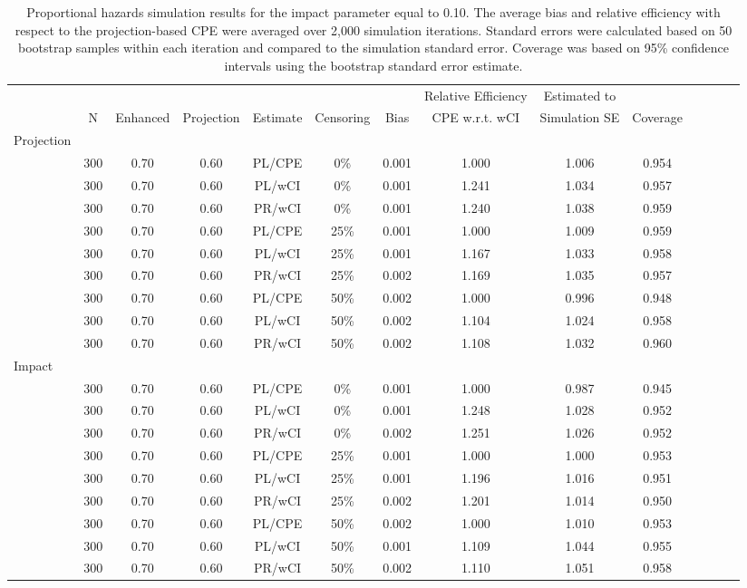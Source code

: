 \documentclass[12pt]{article}
\begin{document}
 
 
 \begin{table}[ht]
 \caption{Proportional hazards simulation results for the impact parameter equal to  0.10.
  The average bias and relative efficiency with respect to the projection-based CPE were averaged over 2,000 simulation iterations. Standard errors were calculated based on 50 bootstrap samples within each iteration and compared to the simulation standard error. Coverage was based on 95\% confidence intervals using the bootstrap standard error estimate.   }
\centering
\tiny
\begin{tabular}{lccccccccccccc} \label{PHsimresultsDelta010}
\vspace{-0.25cm}
   &&&&&&  & Relative Efficiency   & Estimated to  &\\
& N & Enhanced &  Projection & Estimate & Censoring &Bias & CPE w.r.t. wCI & Simulation SE & Coverage \\

 \hline
  \hline
  Projection &&&&&&&&& \\
& 300 &0.70 & 0.60 & PL/CPE  &0\% & 0.001 & 1.000 & 1.006 & 0.954 \\ 
& 300 &0.70 & 0.60 & PL/wCI &0\%  & 0.001 & 1.241 & 1.034 & 0.957 \\ 
& 300 &0.70 & 0.60 & PR/wCI &0\%  &   0.001 & 1.240 & 1.038 & 0.959 \\ 
\hline
& 300 &0.70 & 0.60 & PL/CPE  &25\% & 0.001 & 1.000 & 1.009 & 0.959 \\ 
& 300 &0.70 & 0.60 & PL/wCI &25\%  & 0.001 & 1.167 & 1.033 & 0.958 \\ 
& 300 &0.70 & 0.60 & PR/wCI &25\%  &  0.002 & 1.169 & 1.035 & 0.957 \\ 
\hline
& 300 &0.70 & 0.60 & PL/CPE  &50\%  &  0.002 & 1.000 & 0.996 & 0.948 \\ 
& 300 &0.70 & 0.60 & PL/wCI &50\%  &0.002 & 1.104 & 1.024 & 0.958 \\
& 300 &0.70 & 0.60 & PR/wCI &50\%  & 0.002 & 1.108 & 1.032 & 0.960 \\
  \hline
  \hline
  Impact &&&&&&&&& \\
&     300 &0.70 & 0.60 & PL/CPE   &0\%  &0.001 & 1.000 & 0.987 & 0.945 \\ 
& 300 &0.70 & 0.60 & PL/wCI &0\%  & 0.001 & 1.248 & 1.028 & 0.952 \\
& 300 &0.70 & 0.60 & PR/wCI &0\%  & 0.002 & 1.251 & 1.026 & 0.952 \\
\hline
&   300 &0.70 & 0.60 & PL/CPE   &25\%  & 0.001 & 1.000 & 1.000 & 0.953 \\ 
& 300 &0.70 & 0.60 & PL/wCI &25\%  &  0.001 & 1.196 & 1.016 & 0.951 \\ 
& 300 &0.70 & 0.60 & PR/wCI &25\%  & 0.002 & 1.201 & 1.014 & 0.950 \\ 
\hline
& 300 &0.70 & 0.60 & PL/CPE   &50\%  & 0.002 & 1.000 & 1.010 & 0.953 \\ 
& 300 &0.70 & 0.60 & PL/wCI &50\% &  0.001 & 1.109 & 1.044 & 0.955 \\ 
& 300 &0.70 & 0.60 & PR/wCI &50\% &0.002 & 1.110 & 1.051 & 0.958 \\ 
  \hline
  \hline
\end{tabular}
\end{table}
\end{document}
